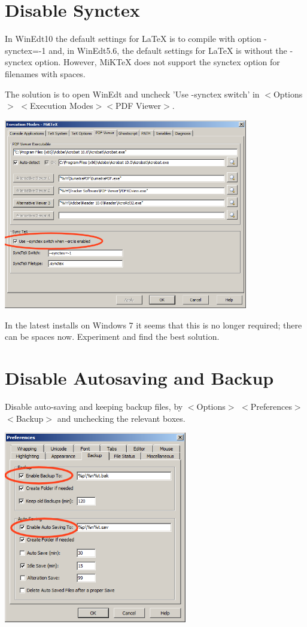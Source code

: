 \section{Disable Synctex}

In WinEdt10 the default settings for LaTeX is to compile with option -synctex=-1 and, in WinEdt5.6, the default settings for LaTeX is without the -synctex option.
However, MiKTeX does not support the synctex option for filenames with spaces.

The solution is to open WinEdt and uncheck 'Use -synctex switch' in $<$Options$>$ $<$Execution Modes$>$$<$PDF Viewer$>$.

\centerline{\includegraphics[bb= 0 0 696 543,width=0.8\textwidth]{eps/synctex.png}}

In the latest installs on Windows 7 it seems that this is no longer required; there can be spaces now. Experiment and find the best solution.


\section{Disable Autosaving and Backup}

Disable auto-saving and keeping backup files, by $<$Options$>$ $<$Preferences$>$$<$Backup$>$ and unchecking the relevant boxes.

\centerline{\includegraphics[bb= 0 0 437 457,width=0.6\textwidth]{pic/savingback.png}}




